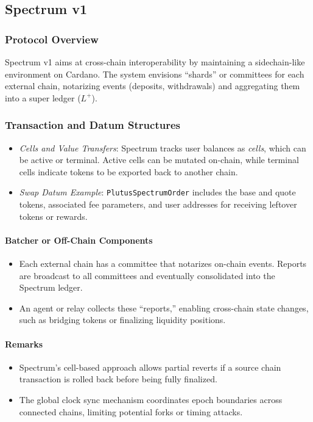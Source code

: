 \documentclass{article}
\begin{document}
\subsection{Spectrum v1}
\label{sec:spectrum}

\subsubsection{Protocol Overview}
Spectrum v1 aims at cross-chain interoperability by maintaining a sidechain-like environment on Cardano. The system envisions ``shards'' or committees for each external chain, notarizing events (deposits, withdrawals) and aggregating them into a super ledger (\(L^+\)).

\subsubsection{Transaction and Datum Structures}
\begin{itemize}
    \item \emph{Cells and Value Transfers}: Spectrum tracks user balances as \emph{cells}, which can be active or terminal. Active cells can be mutated on-chain, while terminal cells indicate tokens to be exported back to another chain.
    \item \emph{Swap Datum Example}: \texttt{PlutusSpectrumOrder} includes the base and quote tokens, associated fee parameters, and user addresses for receiving leftover tokens or rewards.
\end{itemize}

\paragraph{Batcher or Off-Chain Components}
\begin{itemize}
    \item Each external chain has a committee that notarizes on-chain events. Reports are broadcast to all committees and eventually consolidated into the Spectrum ledger.
    \item An agent or relay collects these ``reports,'' enabling cross-chain state changes, such as bridging tokens or finalizing liquidity positions.
\end{itemize}

\paragraph{Remarks}
\begin{itemize}
    \item Spectrum’s cell-based approach allows partial reverts if a source chain transaction is rolled back before being fully finalized.
    \item The global clock sync mechanism coordinates epoch boundaries across connected chains, limiting potential forks or timing attacks.
\end{itemize}
\end{document}
